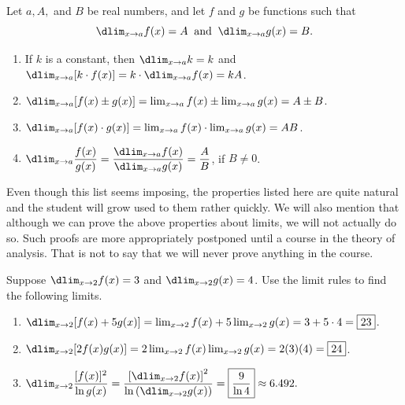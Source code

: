 \documentclass{book}
\begin{document}
\begin{Thm} Let $a, A,$ and $B$ be real numbers, and let $f$ and $g$ be functions such that \[\dlim_{x\to a}f(x) = A\;\;\mbox{and}\;\;\dlim_{x\to a}g(x) = B.\]
\begin{enumerate}
\item If $k$ is a constant, then $\dlim_{x\to a}k = k$ and $\dlim_{x\to a}[k\cdot f(x)] = k\cdot \dlim_{x\to a}f(x) = kA$.\\

\item $\dlim_{x\to a} [f(x) \pm g(x)] = \lim_{x\to a}f(x) \pm \lim_{x\to a} g(x) = A\pm B$.\\

\item $\dlim_{x\to a} [f(x)\cdot g(x)] = \lim_{x\to a}f(x)\cdot \lim_{x\to a} g(x) = AB$.\\

\item $\dlim_{x\to a} \dfrac{f(x)}{ g(x)} = \dfrac{\dlim_{x\to a}f(x)}{\dlim_{x\to a} g(x)} = \dfrac{A}{B}$, if $B\neq 0$.
\end{enumerate}
\end{Thm}\vs

Even though this list seems imposing, the properties listed here are quite natural and the student will grow used to them rather quickly. We will also mention that  although we can prove the above properties about limits, we will not actually do so. Such proofs are more appropriately postponed until a course in the theory of analysis. That is not to say that we will never prove anything in the course.

\begin{Exam} Suppose $\dlim_{x\to 2} f(x) = 3$ and $\dlim_{x\to 2}g(x) = 4$. Use the limit rules to find the following limits.
\begin{enumerate}
\item $\dlim_{x\to 2} [f(x) + 5g(x)]  = \lim_{x\to 2} f(x) + 5\lim_{x\to 2}g(x) = 3+5\cdot4 = \fbox{23}$.\\

\item $\dlim_{x\to 2} [2f(x)g(x)] = 2\lim_{x\to 2} f(x)\lim_{x\to 2} g(x) = 2(3)(4) = \fbox{$24$}$.\\

\item $\dlim_{x\to 2}\dfrac{ [f(x)]^2}{\ln g(x)} = \dfrac{\left[\dlim_{x\to 2}f(x)\right]^2}{\ln\left(\dlim_{x\to 2}g(x)\right)} = \fbox{$\dfrac{9}{\ln 4}$} \approx  6.492.$
\end{enumerate}
\end{Exam}\vs
\end{document}
